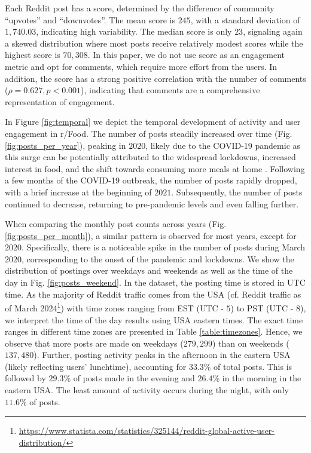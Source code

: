 Each Reddit post has a score, determined by the difference of community ``upvotes'' and ``downvotes''. 
The mean score is $245$, with a standard deviation of $1,740.03$, indicating high variability. The median score is only $23$, signaling again a skewed distribution where most posts receive relatively modest scores while the highest score is $70,308$.
In this paper, we do not use score as an engagement metric and opt for comments, which require more effort from the users. In addition, the score has a strong positive correlation with the number of comments ($\rho = 0.627, p < 0.001$), indicating that comments are a comprehensive representation of engagement. %


In Figure \ref{fig:temporal} we depict the temporal development of activity and user engagement in r/Food. The number of posts steadily increased over time (Fig. \ref{fig:posts_per_year}), peaking in $2020$, likely due to the COVID-19 pandemic as this surge can be potentially attributed to the widespread lockdowns, increased interest in food, and the shift towards consuming more meals at home \cite{gligoric_population-scale_2022}.
Following a few months of the COVID-19 outbreak, the number of posts rapidly dropped, with a brief increase at the beginning of $2021$.
Subsequently, the number of posts continued to decrease, returning to pre-pandemic levels and even falling further. 

When comparing the monthly post counts across years (Fig. \ref{fig:posts_per_month}), a similar pattern is observed for most years, except for $2020$.
Specifically, there is a noticeable spike in the number of posts during March $2020$, corresponding to the onset of the pandemic and lockdowns.
We show the distribution of postings over weekdays and weekends as well as the time of the day in Fig. \ref{fig:posts_weekend}. In the dataset, the posting time is stored in UTC time. 
As the majority of Reddit traffic comes from the USA (cf. Reddit traffic as of March 2024\footnote{\url{https://www.statista.com/statistics/325144/reddit-global-active-user-distribution/}}) with time zones ranging from EST (UTC - $5$) to PST (UTC - $8$), we interpret the time of the day results using USA eastern times. The exact time ranges in different time zones are presented in Table \ref{table:timezones}.
Hence, we observe that more posts are made on weekdays ($279,299$) than on weekends ($137,480$). Further, posting activity peaks in the afternoon in the eastern USA (likely reflecting users' lunchtime), accounting for $33.3$\% of total posts. 
This is followed by $29.3$\% of posts made in the evening and $26.4$\% in the morning in the eastern USA. The least amount of activity occurs during the night, with only $11.6$\% of posts.

